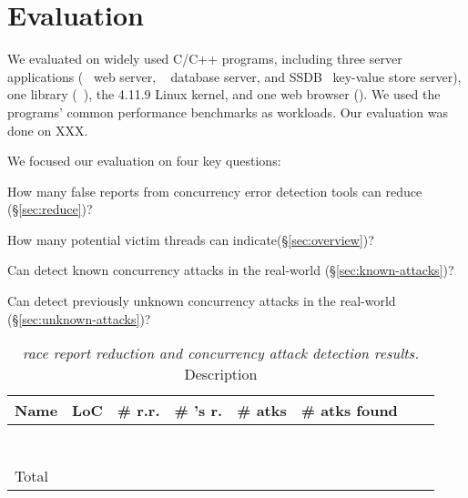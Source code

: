 \section{Evaluation}\label{sec:evaluation}

We evaluated \xxx on \nreproducedProgs widely used C/C++ programs, including 
three server applications (\apache~\cite{apache} web server, 
\mysql~\cite{mysql} database server, and SSDB~\cite{SSDB} 
key-value store server), one library (\libsafe~\cite{libsafe}), the 4.11.9 Linux 
kernel, and one web browser (\chrome). We used the programs' common performance 
benchmarks as workloads. Our evaluation was done on XXX. 


We focused our evaluation on four key questions:
\begin{tightenum}
	
	
	\item How many false reports from concurrency error 
	detection tools can \xxx reduce (\S\ref{sec:reduce})?
	
	\item How many potential victim threads can \xxx indicate(\S\ref{sec:overview})?
	
	\item Can \xxx detect known concurrency attacks in the real-world
	(\S\ref{sec:known-attacks})?
	
	\item Can \xxx detect previously unknown concurrency attacks in the real-world
	(\S\ref{sec:unknown-attacks})?
	
	
\end{tightenum}


\begin{table}[ht!]
	\footnotesize
	\centering
	\begin{tabular}{l|r|r|r|r|r|r|r}
		{\bf Name} & {\bf LoC} & {\bf \# r.r.}& {\bf \# \xxx's r.} & {\bf \# atks} & {\bf \# atks found}  \\
		\hline
		\apache    &             &     &    &   &  \\
		\chrome    &             &      &   &    &  \\
		\libsafe   &             &     &  &  &  \\
		\linux     &            &    &    &    &   \\
		\mysql     &             &     &    &    &  \\
		\ssdb      &             &     &    &    &   \\
		\hline\\[-2.3ex]
		Total      &             &    &   &   &  \\
	\end{tabular}
	\vspace{-.1in}
	\caption{{\em \xxx race report reduction and concurrency attack detection results.} \rm {Description}} 
	\label{tab:eval}
	\vspace{-.2in}
\end{table}



